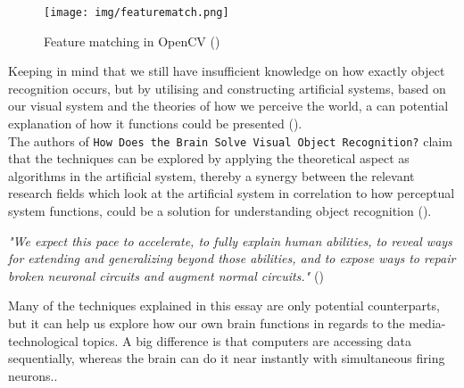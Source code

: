 \documentclass{article}
\newcommand{\goodcite}[1]{ {(\cite{#1})}}
\begin{document}
\begin{figure}[H]
    \centering
    \texttt{[image: img/featurematch.png]}
    \caption{Feature matching in OpenCV\goodcite{OpenCV}}
    \label{fig:feature_matching}
\end{figure}


Keeping in mind that we still have insufficient knowledge on how exactly object recognition occurs, but by utilising and constructing artificial systems, based on our visual system and the theories of how we perceive the world, a can potential explanation of how it functions could be presented\goodcite{solveVisual}.\\
The authors of \texttt{How Does the Brain Solve Visual Object Recognition?} claim that the techniques can be explored by applying the theoretical aspect as algorithms in the artificial system, thereby a synergy between the relevant research fields which look at the artificial system in correlation to how perceptual system functions, could be a solution for understanding object recognition\goodcite{solveVisual}.\\
\begin{center}
    \textit{"We expect this pace to accelerate, to fully explain human abilities, to reveal ways for extending and generalizing beyond those abilities, and to expose ways to repair broken neuronal circuits and augment normal circuits."}\goodcite{solveVisual}\medskip \\
\end{center}
Many of the techniques explained in this essay are only potential counterparts, but it can help us explore how our own brain functions in regards to the media-technological topics. A big difference is that computers are accessing data sequentially, whereas the brain can do it near instantly with simultaneous firing neurons..
\end{document}
